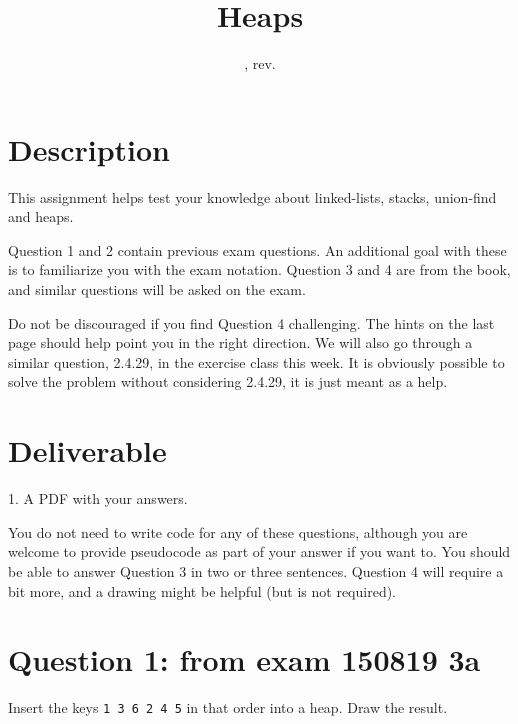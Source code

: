 \documentclass{tufte-handout}
\title{Heaps}
\author{}
\date {\GITAuthorDate, rev. \GITAbrHash}
\begin{document}
\maketitle

\begin{abstract}
\end{abstract}

\section{\textbf{Description}}
  This assignment helps test your knowledge about linked-lists, stacks, union-find and heaps. 
  
  \medskip Question 1 and 2 contain previous exam questions. An additional goal with these is to familiarize you with the exam notation. Question 3 and 4 are from the book, and similar questions will be asked on the exam.
  
  \medskip Do not be discouraged if you find Question 4 challenging. The hints on the last page should help point you in the right direction. We will also go through a similar question, 2.4.29, in the exercise class this week. It is obviously possible to solve the problem without considering 2.4.29, it is just meant as a help.

\section{\textbf{Deliverable}}
1. A PDF with your answers.

\medskip You do not need to write code for any of these questions, although you are welcome to provide pseudocode as part of your answer if you want to. You should be able to answer Question 3 in two or three sentences. Question 4 will require a bit more, and a drawing might be helpful (but is not required).


\section{\textbf{Question 1}: from exam 150819 3a}
Insert the keys {\tt 1 3 6 2 4 5} in that order into a heap. Draw the result.
\end{document}
